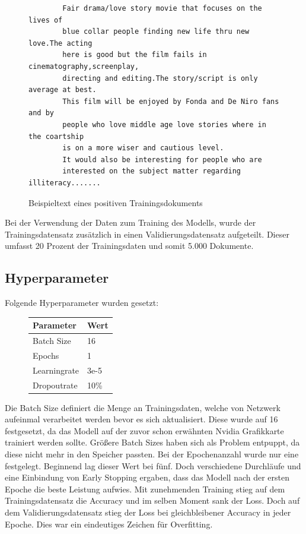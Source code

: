 \documentclass[DIV=13,fontsize=11pt]{scrartcl}
\begin{document}
\begin{figure}[H]
    \centering
    \begin{lstlisting}
        Fair drama/love story movie that focuses on the lives of 
        blue collar people finding new life thru new love.The acting 
        here is good but the film fails in cinematography,screenplay,
        directing and editing.The story/script is only average at best.
        This film will be enjoyed by Fonda and De Niro fans and by 
        people who love middle age love stories where in the coartship 
        is on a more wiser and cautious level.
        It would also be interesting for people who are 
        interested on the subject matter regarding illiteracy.......
    \end{lstlisting}
    \caption{Beispieltext eines positiven Trainingsdokuments}
\end{figure}

Bei der Verwendung der Daten zum Training des Modells, wurde der Trainingsdatensatz zusätzlich in einen
Validierungsdatensatz aufgeteilt. Dieser umfasst 20 Prozent der Trainingsdaten und somit 5.000 Dokumente.

\subsection{Hyperparameter}

Folgende Hyperparameter wurden gesetzt:

\begin{figure}[H]
    \centering
    \begin{tabular}{ll}
        \toprule
        Parameter    & Wert \\
        \midrule
        Batch Size   & 16   \\
        Epochs       & 1    \\
        Learningrate & 3e-5 \\
        Dropoutrate  & 10\% \\
        \bottomrule
    \end{tabular}
\end{figure}

Die Batch Size definiert die Menge an Trainingsdaten, welche von Netzwerk aufeinmal
verarbeitet werden bevor es sich aktualisiert. Diese wurde auf 16 festgesetzt, da das
Modell auf der zuvor schon erwähnten Nvidia Grafikkarte trainiert werden sollte.
Größere Batch Sizes haben sich als Problem entpuppt, da diese nicht mehr in den
Speicher passten.
Bei der Epochenanzahl wurde nur eine festgelegt.
Beginnend lag dieser Wert bei fünf. Doch verschiedene Durchläufe und eine Einbindung
von Early Stopping ergaben, dass das Modell nach der ersten Epoche die
beste Leistung aufwies. Mit zunehmenden Training stieg auf dem Trainingsdatensatz
die Accuracy und im selben Moment sank der Loss. Doch auf dem Validierungsdatensatz
stieg der Loss bei gleichbleibener Accuracy in jeder Epoche. Dies war ein eindeutiges
Zeichen für Overfitting.
\end{document}
